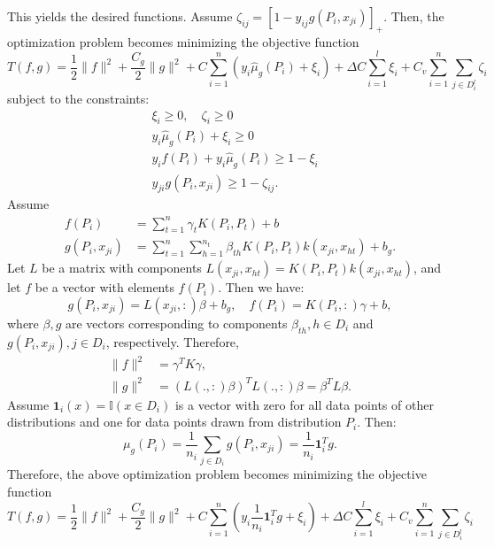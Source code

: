 	This yields the desired functions. Assume $\zeta_{ij} = [1 - y_{ij} g(P_i, x_{ji})]_+$. Then, the optimization problem becomes minimizing the objective function
	\begin{equation}
		T(f, g) = \frac{1}{2}\|f\|^2 + \frac{C_g}{2}\|g\|^2 + C \sum_{i=1}^{n} \left( y_i \hat{\mu}_g(P_i) + \xi_i \right) + \Delta C \sum_{i=1}^{l} \xi_i + C_v \sum_{i=1}^{n} \sum_{j \in D_i^l} \zeta_i
	\end{equation}
	subject to the constraints:
	\begin{align}
		&\xi_i \ge 0, \quad \zeta_i \ge 0 \\
		&y_i \hat{\mu}_g(P_i) + \xi_i \ge 0 \\
		&y_i f(P_i) + y_i \hat{\mu}_g(P_i) \ge 1 - \xi_i \\
		&y_{ji} g(P_i, x_{ji}) \ge 1 - \zeta_{ij}.
	\end{align}
	Assume
	\begin{align}
		f(P_i) &= \sum_{t=1}^{n} \gamma_t K(P_i, P_t) + b \\
		g(P_i, x_{ji}) &= \sum_{t=1}^{n} \sum_{h=1}^{n_t} \beta_{th} K(P_i, P_t) k(x_{ji}, x_{ht}) + b_g.
	\end{align}
	Let $L$ be a matrix with components $L(x_{ji}, x_{ht}) = K(P_i, P_t) k(x_{ji}, x_{ht})$, and let $f$ be a vector with elements $f(P_i)$. Then we have:
	\begin{equation}
		g(P_i, x_{ji}) = L(x_{ji}, :) \beta + b_g, \quad f(P_i) = K(P_i, :) \gamma + b,
	\end{equation}
	where $\beta, g$ are vectors corresponding to components $\beta_{th}, h \in D_i$ and $g(P_i, x_{ji}), j \in D_i$, respectively. Therefore,
	\begin{align}
		\|f\|^2 &= \gamma^T K \gamma, \\
		\|g\|^2 &= (L(., :) \beta)^T L(., :) \beta = \beta^T L \beta.
	\end{align}
	Assume $\mathbf{1}_i(x) = \mathbb{I}(x \in D_i)$ is a vector with zero for all data points of other distributions and one for data points drawn from distribution $P_i$. Then:
	\begin{equation}
		\mu_g(P_i) = \frac{1}{n_i} \sum_{j \in D_i} g(P_i, x_{ji}) = \frac{1}{n_i} \mathbf{1}_i^T g.
	\end{equation}
	Therefore, the above optimization problem becomes minimizing the objective function
	\begin{equation}
		T(f, g) = \frac{1}{2}\|f\|^2 + \frac{C_g}{2}\|g\|^2 + C \sum_{i=1}^{n} \left( y_i \frac{1}{n_i} \mathbf{1}_i^T g + \xi_i \right) + \Delta C \sum_{i=1}^{l} \xi_i + C_v \sum_{i=1}^{n} \sum_{j \in D_i^l} \zeta_i
	\end{equation}
